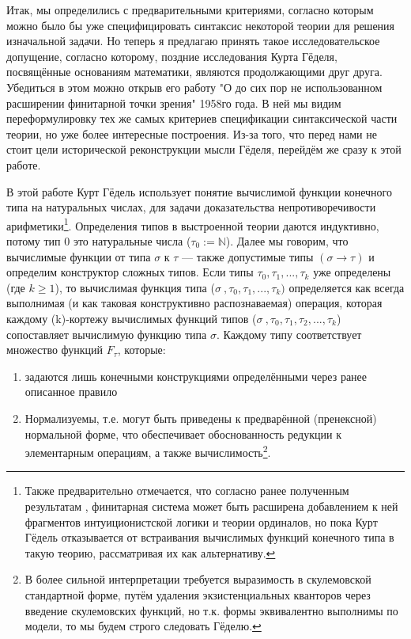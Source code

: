 \documentclass[14pt]{extarticle}
\begin{document}
	Итак, мы определились с предварительными критериями, согласно которым можно было бы уже специфицировать синтаксис некоторой теории для решения изначальной задачи. Но теперь я предлагаю принять такое исследовательское допущение, согласно которому, поздние исследования Курта Гёделя, посвящённые основаниям математики, являются продолжающими друг друга. Убедиться в этом можно открыв его работу "О до сих пор не использованном расширении финитарной точки зрения" \cite{Godel1958} 1958го года. В ней мы видим переформулировку тех же самых критериев спецификации синтаксической части теории, но уже более интересные построения. Из-за того, что перед нами не стоит цели исторической реконструкции мысли Гёделя, перейдём же сразу к этой работе.
	
	В этой работе Курт Гёдель использует понятие вычислимой функции конечного типа на натуральных числах, для задачи доказательства непротиворечивости арифметики\footnote{Также предварительно отмечается, что согласно ранее полученным результатам \cite{Godel_cont}, финитарная система может быть расширена добавлением к ней фрагментов интуиционистской логики и теории ординалов, но пока Курт Гёдель отказывается от встраивания вычислимых функций конечного типа в такую теорию, рассматривая их как альтернативу.}. Определения типов в выстроенной теории даются индуктивно, потому тип 0 это натуральные числа (\(\tau_0 := \mathbb{N}\)). Далее мы говорим, что вычислимые функции от типа \(\sigma\) к \(\tau\) — также допустимые типы \((\sigma \rightarrow \tau)\) и определим конструктор сложных типов. Если типы \(\tau_0, \tau_1, ..., \tau_k\) уже определены (где \(k \geq 1\)), то вычислимая функция типа (\(\sigma\ , \tau_0, \tau_1, ..., \tau_k)\) определяется как всегда выполнимая (и как таковая конструктивно распознаваемая) операция, которая каждому (k)-кортежу вычислимых функций типов (\(\sigma\ ,\tau_0, \tau_1, \tau_2, ..., \tau_k\)) сопоставляет вычислимую функцию типа \(\sigma\). Каждому типу соответствует множество функций \(F_\tau\), которые:
	\begin{enumerate}
		\item задаются лишь конечными конструкциями определёнными через ранее описанное правило
		\item Нормализуемы, т.е. могут быть приведены к предварённой (пренексной) нормальной форме, что обеспечивает обоснованность редукции к элементарным операциям, а также вычислимость\footnote{В более сильной интерпретации требуется выразимость в скулемовской стандартной форме, путём удаления экзистенциальных кванторов через введение скулемовских функций, но т.к. формы эквивалентно выполнимы по модели, то мы будем строго следовать Гёделю.}.
	\end{enumerate}
\end{document}
